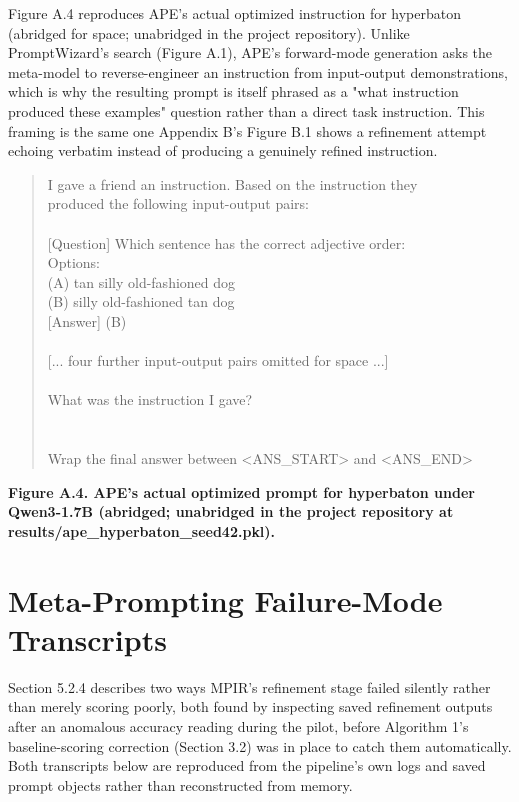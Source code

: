\documentclass[a4paper,fleqn]{cas-sc}
\begin{document}
Figure A.4 reproduces APE's actual optimized instruction for hyperbaton (abridged for space; unabridged in the project repository). Unlike PromptWizard's search (Figure A.1), APE's forward-mode generation \citep{zhou2023} asks the meta-model to reverse-engineer an instruction from input-output demonstrations, which is why the resulting prompt is itself phrased as a "what instruction produced these examples" question rather than a direct task instruction. This framing is the same one Appendix B's Figure B.1 shows a refinement attempt echoing verbatim instead of producing a genuinely refined instruction.

\centering
\begin{quote}\ttfamily\small
I gave a friend an instruction. Based on the instruction they\\{}
produced the following input-output pairs:\\{}
~\\{}
[Question] Which sentence has the correct adjective order:\\{}
Options:\\{}
(A) tan silly old-fashioned dog\\{}
(B) silly old-fashioned tan dog\\{}
[Answer] (B)\\{}
~\\{}
[... four further input-output pairs omitted for space ...]\\{}
~\\{}
What was the instruction I gave?\\{}
~\\{}
~\\{}
Wrap the final answer between <ANS\_\allowbreak{}START> and <ANS\_\allowbreak{}END>\\{}
\end{quote}
\par\noindent\textbf{Figure A.4. APE's actual optimized prompt for hyperbaton under Qwen3-1.7B (abridged; unabridged in the project repository at results/ape\_\allowbreak{}hyperbaton\_\allowbreak{}seed42.pkl).}

\section{Meta-Prompting Failure-Mode Transcripts}

Section 5.2.4 describes two ways MPIR's refinement stage failed silently rather than merely scoring poorly, both found by inspecting saved refinement outputs after an anomalous accuracy reading during the pilot, before Algorithm 1's baseline-scoring correction (Section 3.2) was in place to catch them automatically. Both transcripts below are reproduced from the pipeline's own logs and saved prompt objects rather than reconstructed from memory.
\end{document}
